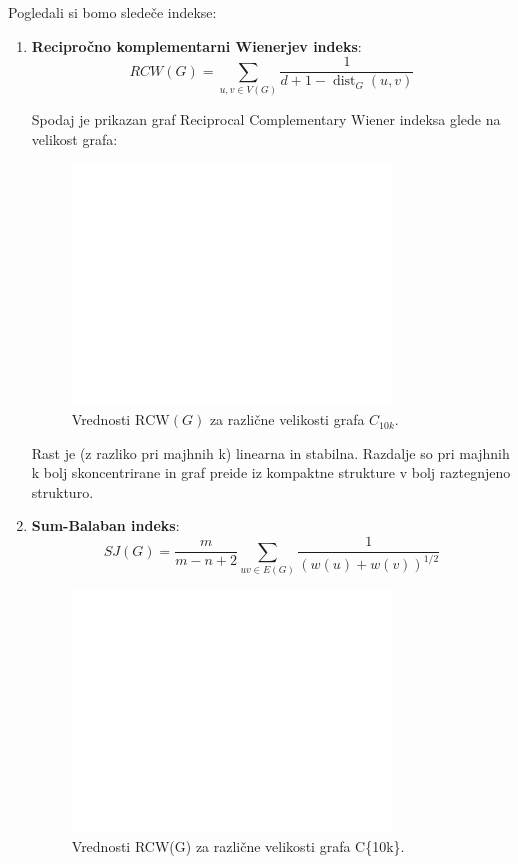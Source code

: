 \documentclass[a4paper, 12pt]{article}
\begin{document}
Pogledali si bomo sledeče indekse:
\begin{enumerate}
    \item \textbf{Recipročno komplementarni Wienerjev indeks}:
    \[
    RCW(G) = \sum_{{u,v} \in V(G)} \frac{1}{d + 1 - \operatorname{dist}_G(u,v)}
    \]




Spodaj je prikazan graf Reciprocal Complementary Wiener indeksa glede na velikost grafa:

\begin{figure}[h!]
    \centering
    \includegraphics[width=0.8\textwidth]{rcw_index_plot.png}
    \caption{Vrednosti $\text{RCW}(G)$ za različne velikosti grafa $C_{10k}$.}
    \label{fig:rcw}
\end{figure}

Rast je (z razliko pri majhnih k) linearna in stabilna. Razdalje so pri majhnih k bolj skoncentrirane in graf preide iz kompaktne strukture v bolj raztegnjeno strukturo. 
    
    \item \textbf{Sum-Balaban indeks}:
    \[
    SJ(G) = \frac{m}{m - n + 2} \sum_{uv \in E(G)} \frac{1}{(w(u) + w(v))^{1/2}}
    \]

    \begin{figure}[h!]
        \centering
        \includegraphics[width=0.8\textwidth]{sb_index_plot.png}
        \caption{Vrednosti RCW(G) za različne velikosti grafa C\{10k\}.}
        \label{fig:rcw}
    \end{figure}


\end{enumerate}
\end{document}
